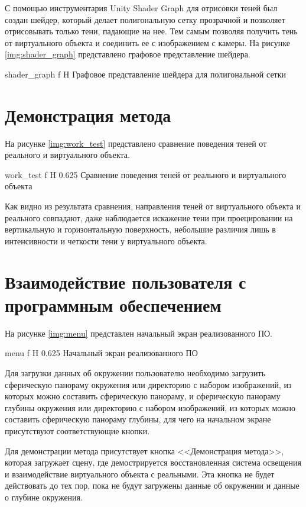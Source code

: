 С помощью инструментария Unity Shader Graph \cite{shader_graph} для отрисовки теней был создан шейдер, который делает полигональную сетку прозрачной и позволяет отрисовывать только тени, падающие на нее. Тем самым позволяя получить тень от виртуального объекта и соединить ее с изображением с камеры. На рисунке \ref{img:shader_graph} представлено графовое представление шейдера.

{shader_graph}
{f}
{H}
{\textwidth}
{Графовое представление шейдера для полигональной сетки}

\section{Демонстрация метода}

На рисунке \ref{img:work_test} представлено сравнение поведения теней от реального и виртуального объекта.

{work_test}
{f}
{H}
{0.625\textwidth}
{Сравнение поведения теней от реального и виртуального объекта}

Как видно из результата сравнения, направления теней от виртуального объекта и реального совпадают, даже наблюдается искажение тени при проецировании на вертикальную и горизонтальную поверхность, небольшие различия лишь в интенсивности и четкости тени у виртуального объекта.

\section{Взаимодействие пользователя с программным обеспечением}

На рисунке \ref{img:menu} представлен начальный экран реализованного ПО.

{menu}
{f}
{H}
{0.625\textwidth}
{Начальный экран реализованного ПО}

Для загрузки данных об окружении пользователю необходимо загрузить сферическую панораму окружения или директорию с набором изображений, из которых можно составить сферическую панораму, и сферическую панораму глубины окружения или директорию с набором изображений, из которых можно составить сферическую панораму глубины, для чего на начальном экране присутствуют соответствующие кнопки.

Для демонстрации метода присутствует кнопка <<Демонстрация метода>>, которая загружает сцену, где демострируется восстановленная система освещения и взаимодействие виртуального объекта с реальными. Эта кнопка не будет действовать до тех пор, пока не будут загружены данные об окружении и данные о глубине окружения. 

